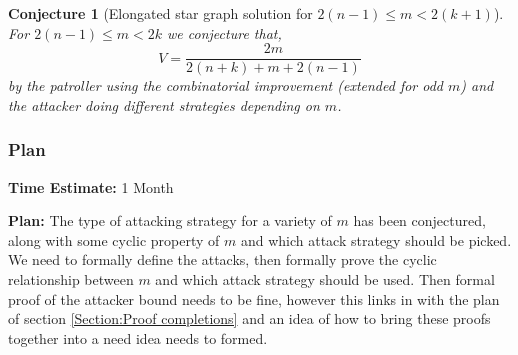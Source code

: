 \documentclass[a4paper,10pt]{article}
\newtheorem{conjecture}[theorem]{Conjecture}
\theoremstyle{definition}
\theoremstyle{definition}
\theoremstyle{remark}
\theoremstyle{definition}
\begin{document}
\begin{myfigure}
\begin{center}
{}
\end{center}
\caption{Grid solution of $m=6$ on $S_{7}^{5}$ with two example paths}
\label{Figure:Example of attack below bound}
\end{myfigure}

\begin{conjecture}[Elongated star graph solution for $2(n-1) \leq m < 2(k+1)$]
For $2(n-1) \leq m < 2k$ we conjecture that,
$$V=\frac{2m}{2(n+k)+m+2(n-1)}$$
by the patroller using the combinatorial improvement (extended for odd $m$) and the attacker doing different strategies depending on $m$.
\end{conjecture}

\subsubsection{Plan}
\textbf{Time Estimate:} 1 Month

\textbf{Plan:} The type of attacking strategy for a variety of $m$ has been conjectured, along with some cyclic property of $m$ and which attack strategy should be picked. We need to formally define the attacks, then formally prove the cyclic relationship between $m$ and which attack strategy should be used. Then formal proof of the attacker bound needs to be fine, however this links in with the plan of section \ref{Section:Proof completions} and an idea of how to bring these proofs together into a need idea needs to formed.
\end{document}
